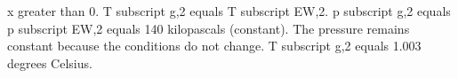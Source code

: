 x greater than 0.  
T subscript g,2 equals T subscript EW,2.  
p subscript g,2 equals p subscript EW,2 equals 140 kilopascals (constant).  
The pressure remains constant because the conditions do not change.  
T subscript g,2 equals 1.003 degrees Celsius.